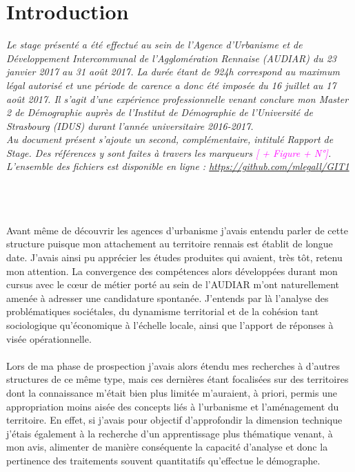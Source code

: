 \documentclass{bredele}
\begin{document}
\chapter*{Introduction}
\begin{minipage}[top]{14cm}
\small{\textit{Le stage présenté a été effectué au sein de l’Agence d’Urbanisme et de Développement Intercommunal de l’Agglomération Rennaise (AUDIAR) du 23 janvier 2017 au 31 août 2017. La durée étant de 924h correspond au maximum légal autorisé et une période de carence a donc été imposée du 16 juillet au 17 août 2017. Il s’agit d’une expérience professionnelle venant conclure mon Master 2 de Démographie auprès de l’Institut de Démographie de l’Université de Strasbourg (IDUS) durant l’année universitaire 2016-2017.
\\Au document présent s'ajoute un second, complémentaire, intitulé Rapport de Stage. Des références y sont faites à travers les marqueurs \textcolor{magenta}{[ + Figure + N°]}. \\L'ensemble des fichiers est disponible en ligne : \href{https://github.com/mlegall/GIT1}{https://github.com/mlegall/GIT1}}}
\end{minipage}
\\\\\\Avant même de découvrir les agences d’urbanisme j’avais entendu parler de cette structure puisque mon attachement au territoire rennais est établit de longue date. J’avais ainsi pu apprécier les études produites qui avaient, très tôt, retenu mon attention. La convergence des compétences alors développées durant mon cursus avec le cœur de métier porté au sein de l’AUDIAR m’ont naturellement amenée à adresser une candidature spontanée. J’entends par là l’analyse des problématiques sociétales, du dynamisme territorial et de la cohésion tant sociologique qu’économique à l’échelle locale, ainsi que l'apport de réponses à visée opérationnelle.
\\\\
Lors de ma phase de prospection j’avais alors étendu mes recherches à d’autres structures de ce même type, mais ces dernières étant focalisées sur des territoires dont la connaissance m’était bien plus limitée m’auraient, à priori, permis une appropriation moins aisée des concepts liés à l’urbanisme et l’aménagement du territoire. En effet, si j’avais pour objectif d’approfondir la dimension technique j’étais également à la recherche d’un apprentissage plus thématique venant, à mon avis, alimenter de manière conséquente la capacité d’analyse et donc la pertinence des traitements souvent quantitatifs qu’effectue le démographe.
\end{document}
